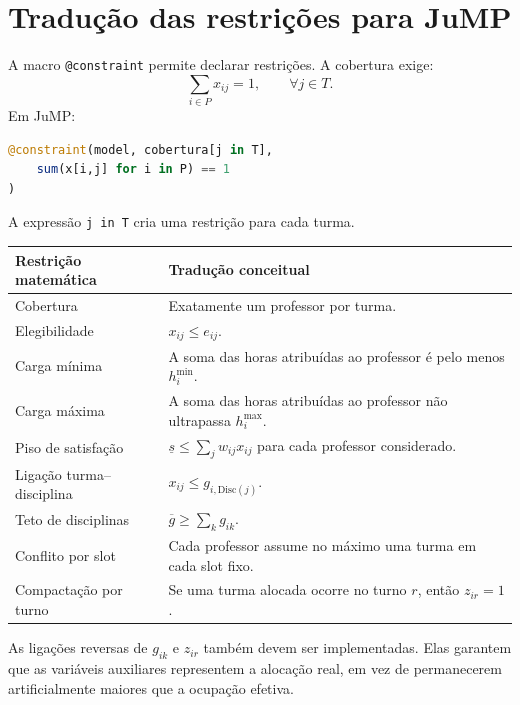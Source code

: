 \documentclass[11pt,a4paper]{article}
\begin{document}
\section{Tradução das restrições para JuMP}
A macro \texttt{@constraint} permite declarar restrições. A cobertura exige:
\begin{equation}
\sum_{i\in P}x_{ij}=1,\qquad \forall j\in T.
\end{equation}
Em JuMP:
\begin{lstlisting}[language=Julia]
@constraint(model, cobertura[j in T],
    sum(x[i,j] for i in P) == 1
)
\end{lstlisting}
A expressão \texttt{j in T} cria uma restrição para cada turma.
\begin{center}
\begin{tabular}{p{}p{}}
\toprule
\textbf{Restrição matemática} & \textbf{Tradução conceitual}\\
\midrule
Cobertura & Exatamente um professor por turma.\\
Elegibilidade & $x_{ij}\leq e_{ij}$.\\
Carga mínima & A soma das horas atribuídas ao professor é pelo menos $h_i^{\min}$.\\
Carga máxima & A soma das horas atribuídas ao professor não ultrapassa $h_i^{\max}$.\\
Piso de satisfação & $\underline{s}\leq\sum_j w_{ij}x_{ij}$ para cada professor considerado.\\
Ligação turma--disciplina & $x_{ij}\leq g_{i,\mathrm{Disc}(j)}$.\\
Teto de disciplinas & $\overline{g}\geq\sum_k g_{ik}$.\\
Conflito por slot & Cada professor assume no máximo uma turma em cada slot fixo.\\
Compactação por turno & Se uma turma alocada ocorre no turno $r$, então $z_{ir}=1$.\\
\bottomrule
\end{tabular}
\end{center}
As ligações reversas de $g_{ik}$ e $z_{ir}$ também devem ser implementadas. Elas garantem que as variáveis auxiliares representem a alocação real, em vez de permanecerem artificialmente maiores que a ocupação efetiva.
\end{document}
